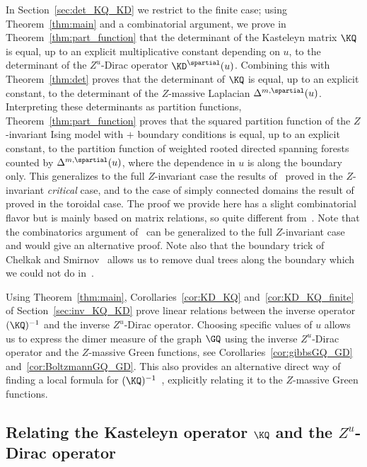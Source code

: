 \documentclass[a4paper,twoside,11pt]{article}
\begin{document}
In Section~\ref{sec:det_KQ_KD} we restrict to the finite case;
using Theorem~\ref{thm:main} and a combinatorial argument, we prove in Theorem~\ref{thm:part_function} that the determinant of the Kasteleyn
matrix $\KQ$ is equal, up to an explicit multiplicative constant depending on $u$, to the determinant of the $Z^u$-Dirac operator $\KD^\spartial(u)$. 
Combining this with Theorem~\ref{thm:det} proves that the determinant of $\KQ$ is equal, up to an explicit constant, to the 
determinant of the $Z$-massive Laplacian $\Delta^{m,\spartial}(u)$. Interpreting these determinants as partition functions, 
Theorem~\ref{thm:part_function} proves that the squared partition function of the $Z$-invariant Ising model with $+$ boundary conditions
is equal, up to an explicit constant, to the partition function of weighted rooted directed spanning forests counted by
$\Delta^{m,\spartial}(u)$, where the dependence in $u$ is along the boundary only. This generalizes to the full $Z$-invariant case the results
of~\cite{deTiliere:mapping,deTiliere:partition} proved in the $Z$-invariant \emph{critical} case, and to the case of simply connected domains 
the result of~\cite{BdtR2} proved in the toroidal case. 
The proof we provide here has a slight combinatorial flavor but is mainly based on matrix relations, 
so quite different from~\cite{deTiliere:mapping,deTiliere:partition}. Note that the combinatorics argument of~\cite{deTiliere:partition} can be generalized to the full $Z$-invariant case and would 
give an alternative proof. Note also that the boundary trick of Chelkak and Smirnov~\cite{ChelkakSmirnov:ising} allows us 
to remove dual trees along the boundary which we could not do in~\cite{deTiliere:partition}.

Using Theorem~\ref{thm:main}, Corollaries~\ref{cor:KD_KQ} and~\ref{cor:KD_KQ_finite}
of Section~\ref{sec:inv_KQ_KD} prove linear relations between the inverse operator $(\KQ)^{-1}$ and the inverse $Z^u$-Dirac operator. 
Choosing specific values of $u$ allows us to express
the dimer measure of the graph $\GQ$ using the inverse $Z^u$-Dirac operator and the $Z$-massive Green functions,
see Corollaries~\ref{cor:gibbsGQ_GD} and~\ref{cor:BoltzmannGQ_GD}. This also provides an alternative direct way of finding a local 
formula for $(\KQ)^{-1}$~\cite{BdtR2}, explicitly relating it to the $Z$-massive Green functions.




\subsection{Relating the Kasteleyn operator $\KQ$ and the $Z^u$-Dirac operator}\label{sec:KQ_KD_relation}
\end{document}
